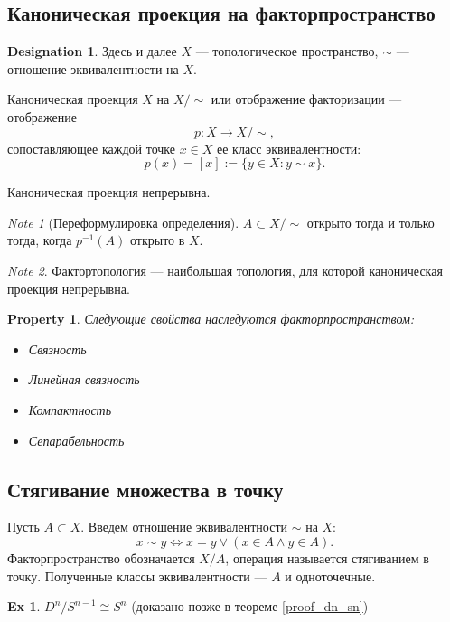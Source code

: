 \documentclass[11pt]{book}
\theoremstyle{definition}
\theoremstyle{plain}
\theoremstyle{plain}
\newtheorem*{prop}{Property}
\theoremstyle{definition}
\newtheorem*{ex}{Ex}
\newtheorem*{name}{Designation}
\theoremstyle{remark}
\newtheorem*{note}{Note}
\begin{document}
\subsection{Каноническая проекция на факторпространство}
\begin{name}
    Здесь и далее $ X$ ---  топологическое пространство, $ \sim $ --- отношение эквивалентности на $ X$.
\end{name}
\begin{defn}
    Каноническая проекция $ X$ на $ X /\! \sim $ или отображение факторизации --- отображение
    \[
	p: X \to  X/\!\sim
    ,\]
    сопоставляющее каждой точке $ x \in  X$ ее класс эквивалентности:
    \[
	p(x) = [x]:=\{y \in  X: y \sim x\}
    .\]
\end{defn}
\begin{thm}
    Каноническая проекция непрерывна.
\end{thm}
\begin{note}[Переформулировка определения]
    $ A \subset X / \!\sim $ открыто тогда и только тогда, когда  $ p^{-1}(A)$ открыто в $ X$.
\end{note}
\begin{note}
    Фактортопология --- наибольшая топология, для которой каноническая проекция непрерывна.
\end{note}
\begin{prop}
    Следующие свойства наследуются факторпространством:
    $ $
    \begin{itemize}
	\item Связность
	\item Линейная связность
	\item Компактность
	\item Сепарабельность
    \end{itemize}
\end{prop}
\subsection{Стягивание множества в точку}
\begin{defn}
    Пусть $ A\subset X$. Введем отношение эквивалентности $ \sim $ на $ X$:
    \[
	x \sim  y \Longleftrightarrow x = y \vee (x \in  A \wedge y \in  A)
    .\]
    Факторпространство обозначается $ X / A$, операция называется стягиванием в точку. Полученные классы эквивалентности ---  $ A$ и одноточечные.
\end{defn}
\begin{ex}
    $ D^{n}/ S^{n-1} \cong S^{n} $ (доказано позже в теореме \ref{proof_dn_sn})
\end{ex}
\end{document}
